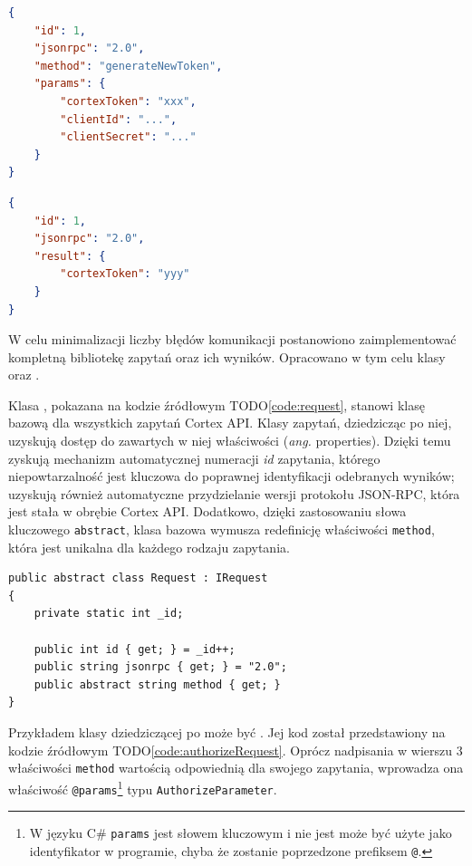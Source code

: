 \documentclass[skorowidz,skroty]{dyplomWEZUT}
\begin{document}
\begin{lstlisting}[language=json]
{
    "id": 1,
    "jsonrpc": "2.0",
    "method": "generateNewToken",
    "params": {
        "cortexToken": "xxx",
        "clientId": "...",
        "clientSecret": "..."
    }
}
\end{lstlisting}

\begin{lstlisting}[language=json]
{
    "id": 1,
    "jsonrpc": "2.0",
    "result": {
        "cortexToken": "yyy"
    }
}
\end{lstlisting}

W celu minimalizacji liczby błędów komunikacji postanowiono zaimplementować kompletną bibliotekę zapytań oraz ich wyników. Opracowano w tym celu klasy  oraz .

Klasa , pokazana na kodzie źródłowym TODO\ref{code:request}, stanowi klasę bazową dla wszystkich zapytań Cortex API. Klasy zapytań, dziedzicząc po niej, uzyskują dostęp do zawartych w niej właściwości (\textit{ang.} properties). Dzięki temu zyskują mechanizm automatycznej numeracji \textit{id} zapytania, którego niepowtarzalność jest kluczowa do poprawnej identyfikacji odebranych wyników; uzyskują również automatyczne przydzielanie wersji protokołu JSON-RPC, która jest stała w obrębie Cortex API. Dodatkowo, dzięki zastosowaniu słowa kluczowego \lstinline[language={[Sharp]C}]{abstract}, klasa bazowa wymusza redefinicję właściwości \lstinline[language={[Sharp]C}]{method}, która jest unikalna dla każdego rodzaju zapytania.

\begin{lstlisting}[language={[Sharp]C}]
public abstract class Request : IRequest
{
    private static int _id;

    public int id { get; } = _id++;
    public string jsonrpc { get; } = "2.0";
    public abstract string method { get; }
}
\end{lstlisting}

Przykładem klasy dziedziczącej po  może być . Jej kod został przedstawiony na kodzie źródłowym TODO\ref{code:authorizeRequest}. Oprócz nadpisania w wierszu 3 właściwości \lstinline[language={[Sharp]C}]{method} wartością odpowiednią dla swojego zapytania, wprowadza ona właściwość \lstinline[language={[Sharp]C}]{@params}\footnote{W języku C\# \lstinline[language={[Sharp]C}]{params} jest słowem kluczowym i nie jest może być użyte jako identyfikator w programie, chyba że zostanie poprzedzone prefiksem \lstinline[language={[Sharp]C}]{@}.} typu \lstinline[language={[Sharp]C}]{AuthorizeParameter}. 
\end{document}
